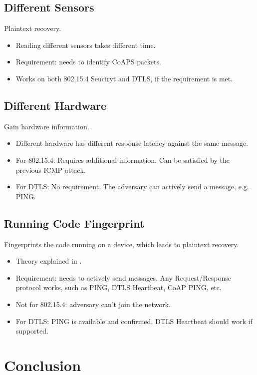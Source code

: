 \documentclass{article}
\begin{document}
\subsection{Different Sensors}
Plaintext recovery.
\begin{itemize}
	\item Reading different sensors takes different time.
	\item Requirement: needs to identify CoAPS packets.
	\item Works on both 802.15.4 Seuciryt and DTLS, if the requirement is met. 
\end{itemize}

\subsection{Different Hardware}
Gain hardware information.
\begin{itemize}
	\item Different hardware has different response latency against the same message.
	\item For 802.15.4: Requires additional information. Can be satisfied by the previous ICMP attack.
	\item For DTLS: No requirement. The adversary can actively send a message, e.g. PING.
\end{itemize}

\subsection{Running Code Fingerprint}
Fingerprints the code running on a device, which leads to plaintext recovery.
\begin{itemize}
	\item Theory explained in .
	\item Requirement: needs to actively send messages. Any Request/Response protocol works, such as PING, DTLS Heartbeat, CoAP PING, etc. 
	\item Not for 802.15.4: adversary can't join the network.
	\item For DTLS: PING is available and confirmed. DTLS Heartbeat should work if supported.
\end{itemize}


\section{Conclusion}




\end{document}
